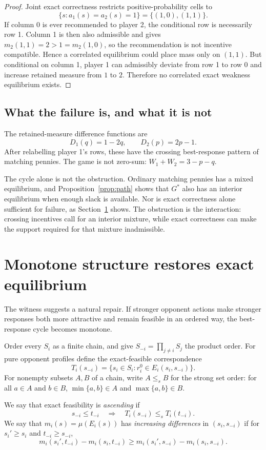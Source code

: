 \documentclass[11pt]{article}
\theoremstyle{definition}
\begin{document}
\begin{proof}
Joint exact correctness restricts positive-probability cells to
\[
\{s:a_1(s)=a_2(s)=1\}=\{(1,0),(1,1)\}.
\]
If column 0 is ever recommended to player 2, the conditional row is necessarily row 1. Column 1 is then also admissible and gives $m_2(1,1)=2>1=m_2(1,0)$, so the recommendation is not incentive compatible. Hence a correlated equilibrium could place mass only on $(1,1)$. But conditional on column 1, player 1 can admissibly deviate from row 1 to row 0 and increase retained measure from $1$ to $2$. Therefore no correlated exact weakness equilibrium exists.
\end{proof}

\subsection{What the failure is, and what it is not}
The retained-measure difference functions are
\[
D_1(q)=1-2q,
\qquad
D_2(p)=2p-1.
\]
After relabelling player 1's rows, these have the crossing best-response pattern of matching pennies. The game is not zero-sum: $W_1+W_2=3-p-q$.

The cycle alone is not the obstruction. Ordinary matching pennies has a mixed equilibrium, and Proposition~\ref{prop:path} shows that $G^*$ also has an interior equilibrium when enough slack is available. Nor is exact correctness alone sufficient for failure, as Section~\ref{sec:monotone} shows. The obstruction is the interaction: crossing incentives call for an interior mixture, while exact correctness can make the support required for that mixture inadmissible.

\section{Monotone structure restores exact equilibrium}\label{sec:monotone}
The witness suggests a natural repair. If stronger opponent actions make stronger responses both more attractive and remain feasible in an ordered way, the best-response cycle becomes monotone.

Order every $S_i$ as a finite chain, and give $S_{-i}=\prod_{j\ne i}S_j$ the product order. For pure opponent profiles define the exact-feasible correspondence
\[
T_i(s_{-i})=\{s_i\in S_i:r_i^0\in E_i(s_i,s_{-i})\}.
\]
For nonempty subsets $A,B$ of a chain, write $A\le_s B$ for the strong set order: for all $a\in A$ and $b\in B$, $\min\{a,b\}\in A$ and $\max\{a,b\}\in B$.

We say that exact feasibility is \emph{ascending} if
\[
s_{-i}\le t_{-i}\quad\Longrightarrow\quad T_i(s_{-i})\le_s T_i(t_{-i}).
\]
We say that $m_i(s)=\mu(E_i(s))$ has \emph{increasing differences} in $(s_i,s_{-i})$ if for $s_i'\ge s_i$ and $t_{-i}\ge s_{-i}$,
\[
m_i(s_i',t_{-i})-m_i(s_i,t_{-i})
\ge
m_i(s_i',s_{-i})-m_i(s_i,s_{-i}).
\]
\end{document}
